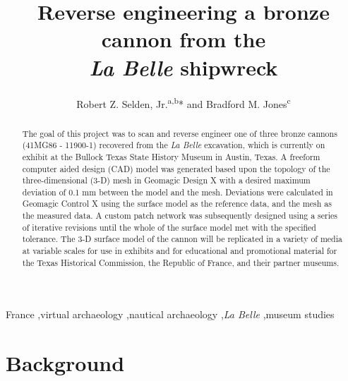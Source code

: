 \documentclass[review]{elsarticle}
\begin{document}
\begin{frontmatter}

\title{Reverse engineering a bronze cannon from the\\\textit{La Belle} shipwreck}

\author{Robert Z. Selden, Jr.\textsuperscript{a,b}* and Bradford M. Jones\textsuperscript{c}}
\address[1]{Heritage Research Center, Stephen F. Austin State University, USA}
\address[2]{Cultural Heritage Department, Jean Monnet University, FR}
\address[3]{Archeology Division, Texas Historical Commission, Austin, USA}

\begin{abstract}
The goal of this project was to scan and reverse engineer one of three bronze cannons (41MG86 - 11900-1) recovered from the \textit{La Belle} excavation, which is currently on exhibit at the Bullock Texas State History Museum in Austin, Texas. A freeform computer aided design (CAD) model was generated based upon the topology of the three-dimensional (3-D) mesh in Geomagic Design X with a desired maximum deviation of 0.1 mm between the model and the mesh. Deviations were calculated in Geomagic Control X using the surface model as the reference data, and the mesh as the measured data. A custom patch network was subsequently designed using a series of iterative revisions until the whole of the surface model met with the specified tolerance. The 3-D surface model of the cannon will be replicated in a variety of media at variable scales for use in exhibits and for educational and promotional material for the Texas Historical Commission, the Republic of France, and their partner museums.
\end{abstract}

\begin{keyword}
France \sep virtual archaeology \sep nautical archaeology \sep \textit{La Belle} \sep museum studies


\end{keyword}

\end{frontmatter}

\linenumbers

\section*{Background}
\end{document}
